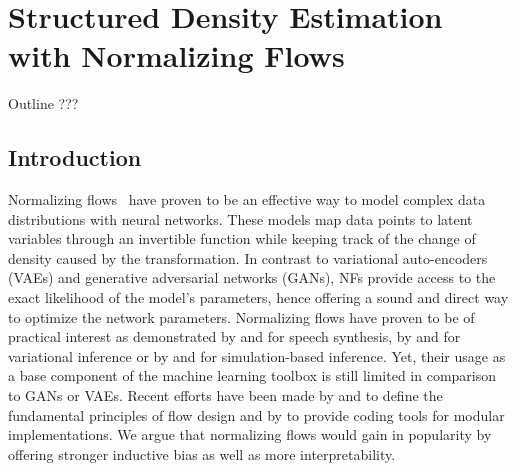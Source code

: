 \chapter{Structured Density Estimation with Normalizing Flows}\label{ch:06}

\begin{remark}{Outline}
???
\end{remark}


\section{Introduction}
Normalizing flows~\citep[NFs, ][]{NF, tabak2010density, tabak2013family, rippel2013high} have proven to be an effective way to model complex data distributions with neural networks. These models map data points to latent variables through an invertible function while keeping track of the change of density caused by the transformation. In contrast to variational auto-encoders (VAEs) and generative adversarial networks (GANs), NFs provide access to the exact likelihood of the model's parameters, hence offering a sound and direct way to optimize the network parameters. Normalizing flows have proven to be of practical interest as demonstrated by \citet{parallel_wavenet, kim2018flowavenet} and \citet{ prenger2019waveglow} for speech synthesis, by \citet{NF, kingma2016improved} and \citet{berg2018sylvester} for variational inference or by \citet{SNL} and \citet{greenberg2019automatic} for simulation-based inference. Yet, their usage as a base component of the machine learning toolbox is still limited in comparison to GANs or VAEs. Recent efforts have been made by \citet{flows-review} and \citet{flow_review_2} to define the fundamental principles of flow design and by \citet{neural-spline-flows} to provide coding tools for modular implementations. We argue that normalizing flows would gain in popularity by offering stronger inductive bias as well as more interpretability. %

